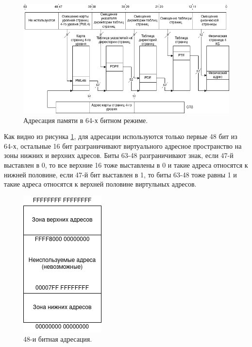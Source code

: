 \begin{figure}[!h]
	\begin{center}
		\includegraphics[scale=0.6]{images/64bit-memory-addressing.png}
		\caption{Адресация памяти в 64-х битном режиме.}
		\label{64bit-memory-addressing}
	\end{center}
\end{figure}

Как видно из рисунка \ref{64bit-memory-addressing}, для адресации используются только первые 48 бит из 64-х, остальные 16 бит разграничивают виртуального адресное пространство на зоны нижних и верхних адресов. Биты 63-48 разграничивают знак, если 47-й выставлен в 0, то все верхние 16 тоже выставлены в 0 и такие адреса относятся к нижней половине, если 47-й бит выставлен в 1, то биты 63-48 тоже равны 1 и такие адреса относятся к верхней половине виртульных адресов.\cite{paging}

\begin{figure}[!h]
	\begin{center}
		\includegraphics[scale=0.6]{images/48bit-half-spaces.png}
		\caption{48-и битная адресация.}
		\label{48bit-half-spaces}
	\end{center}
\end{figure}

